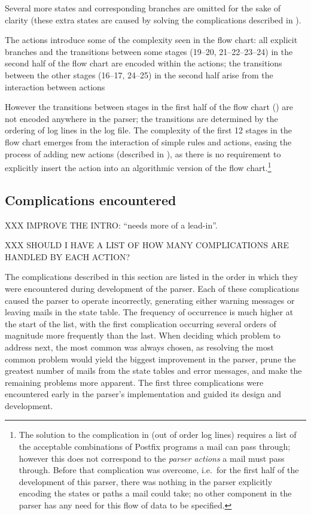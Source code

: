 Several more states and corresponding branches are omitted for the sake of
clarity (these extra states are caused by solving the complications
described in ).

The actions introduce some of the complexity seen in the flow chart: all
explicit branches and the transitions between some stages (19--20,
21--22--23--24) in the second half of the flow chart are encoded within the
actions; the transitions between the other stages (16--17, 24--25) in the
second half arise from the interaction between actions

However the transitions between stages in the first half of the flow chart
() are not encoded anywhere in
the parser; the transitions are determined by the ordering of log lines in
the log file.  The complexity of the first 12 stages in the flow chart
emerges from the interaction of simple rules and actions, easing the
process of adding new actions (described in ), as there is no requirement to explicitly insert the action into
an algorithmic version of the flow chart.\footnote{The solution to the
complication in  (out of order log
lines) requires a list of the acceptable combinations of Postfix programs a
mail can pass through; however this does not correspond to the
\textit{parser actions\/} a mail must pass through.  Before that
complication was overcome, i.e.\ for the first half of the development of
this parser, there was nothing in the parser explicitly encoding the states
or paths a mail could take; no other component in the parser has any need
for this flow of data to be specified.}



\subsection{Complications encountered}

\label{complications}

XXX IMPROVE THE INTRO\@: ``needs more of a lead-in''.

XXX SHOULD I HAVE A LIST OF HOW MANY COMPLICATIONS ARE HANDLED BY EACH
ACTION\@?

The complications described in this section are listed in the order in
which they were encountered during development of the parser.  Each of
these complications caused the parser to operate incorrectly, generating
either warning messages or leaving mails in the state table.  The frequency
of occurrence is much higher at the start of the list, with the first
complication occurring several orders of magnitude more frequently than the
last.  When deciding which problem to address next, the most common was
always chosen, as resolving the most common problem would yield the biggest
improvement in the parser, prune the greatest number of mails from the
state tables and error messages, and make the remaining problems more
apparent.  The first three complications were encountered early in the
parser's implementation and guided its design and development.

